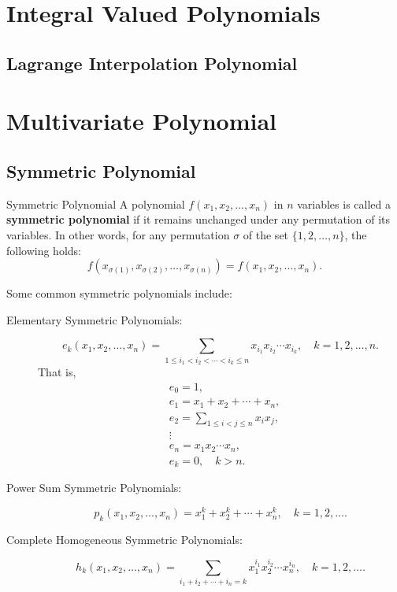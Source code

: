 \documentclass[11pt]{elegantbook}
\begin{document}
\chapter{Integral Valued Polynomials}



\section{Lagrange Interpolation Polynomial}

\chapter{Multivariate Polynomial}
\section{Symmetric Polynomial}
\begin{definition}{Symmetric Polynomial}
    A polynomial \( f(x_1, x_2, \ldots, x_n) \) in \( n \) variables is called a \textbf{symmetric polynomial} 
    if it remains unchanged under any permutation of its variables. 
    In other words, for any permutation \( \sigma \) of the set \( \{1, 2, \ldots, n\} \),
    the following holds:
    \[
    f(x_{\sigma(1)}, x_{\sigma(2)}, \ldots, x_{\sigma(n)}) = f(x_1, x_2, \ldots, x_n).
    \]
\end{definition}
Some common symmetric polynomials include:
\begin{description}
    \item[Elementary Symmetric Polynomials:] 
        \[
        e_k(x_1, x_2, \ldots, x_n) = \sum_{1 \leq i_1 < i_2 < \cdots < i_k \leq n} x_{i_1} x_{i_2} \cdots x_{i_k}, 
        \quad k = 1, 2, \ldots, n.
        \]
        That is,
        \begin{align*}
            &e_{0} = 1, \\
            &e_{1} = x_{1} + x_{2} + \cdots + x_{n}, \\
            &e_{2} = \sum_{1 \leq i < j \leq n} x_{i} x_{j}, \\
            &\vdots \\
            &e_{n} = x_{1} x_{2} \cdots x_{n}, \\
            &e_{k} = 0, \quad k > n.
        \end{align*}
    \item[Power Sum Symmetric Polynomials:] 
        \[
        p_k(x_1, x_2, \ldots, x_n) = x_1^k + x_2^k + \cdots + x_n^k, 
        \quad k = 1, 2, \ldots.
        \]
    \item[Complete Homogeneous Symmetric Polynomials:] 
        \[
        h_k(x_1, x_2, \ldots, x_n) = \sum_{i_1 + i_2 + \cdots + i_n = k} x_1^{i_1} x_2^{i_2} \cdots x_n^{i_n}, 
        \quad k = 1, 2, \ldots.
        \]
\end{description}
\end{document}
